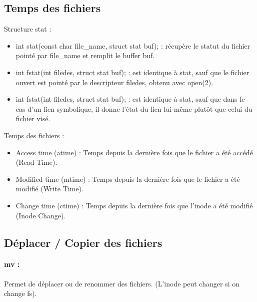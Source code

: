 \documentclass{article}[12pt]
\begin{document}
\subsection{Temps des fichiers}
Structure stat :
\begin{itemize}
	\item int stat(const char \*file\_name, struct stat \*buf); : récupère le statut du fichier pointé par file\_name et remplit le buffer buf.
    \item int fstat(int filedes, struct stat \*buf); : est identique à stat, sauf que le fichier ouvert est pointé par le descripteur filedes, obtenu avec open(2).
    \item int fstat(int filedes, struct stat \*buf);  : est identique à stat, sauf que dans le cas d'un lien symbolique, il donne l'état du lien lui-même plutôt que celui du fichier visé.
\end{itemize}
Temps des fichiers :
\begin{itemize}
\item Access time (atime) : Temps depuis la dernière fois que le fichier a été accédé (Read Time).
\item Modified time (mtime) : Temps depuis la dernière fois que le fichier a été modifié (Write Time).
\item Change time (ctime) : Temps depuis la dernière fois que l'inode a été modifié (Inode Change). 
\end{itemize}
\subsection{Déplacer / Copier des fichiers}
\paragraph{mv : } Permet de déplacer ou de renommer des fichiers. (L'inode peut changer si on change fs).
\end{document}
